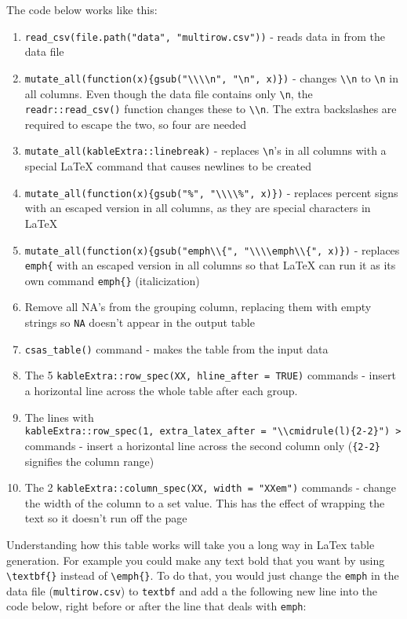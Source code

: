 \documentclass[12pt]{article}\usepackage[]{graphicx}\usepackage[]{color}
\begin{document}
The code below works like this:
\begin{enumerate}
\def\labelenumi{\arabic{enumi}.}

\item
  \texttt{read\_csv(file.path("data",\ "multirow.csv"))} - reads data in from the data file
\item
  \texttt{mutate\_all(function(x)\{gsub("\textbackslash{}\textbackslash{}\textbackslash{}\textbackslash{}n",\ "\textbackslash{}n",\ x)\})} - changes \texttt{\textbackslash{}\textbackslash{}n} to \texttt{\textbackslash{}n} in all columns. Even though the data file contains only \texttt{\textbackslash{}n}, the \texttt{readr::read\_csv()} function changes these to \texttt{\textbackslash{}\textbackslash{}n}. The extra backslashes are required to escape the two, so four are needed
\item
  \texttt{mutate\_all(kableExtra::linebreak)} - replaces \texttt{\textbackslash{}n}'s in all columns with a special LaTeX command that causes newlines to be created
\item
  \texttt{mutate\_all(function(x)\{gsub("\%",\ "\textbackslash{}\textbackslash{}\textbackslash{}\textbackslash{}\%",\ x)\})} - replaces percent signs with an escaped version in all columns, as they are special characters in LaTeX
\item
  \texttt{mutate\_all(function(x)\{gsub("emph\textbackslash{}\textbackslash{}\{",\ "\textbackslash{}\textbackslash{}\textbackslash{}\textbackslash{}emph\textbackslash{}\textbackslash{}\{",\ x)\})} - replaces \texttt{emph\{} with an escaped version in all columns so that LaTeX can run it as its own command \texttt{emph\{\}} (italicization)
\item
  Remove all NA's from the grouping column, replacing them with empty strings so \texttt{NA} doesn't appear in the output table
\item
  \texttt{csas\_table()} command - makes the table from the input data
\item
  The 5 \texttt{kableExtra::row\_spec(XX,\ hline\_after\ =\ TRUE)} commands - insert a horizontal line across the whole table after each group.
\item
  The lines with \texttt{kableExtra::row\_spec(1,\ extra\_latex\_after\ =\ "\textbackslash{}\textbackslash{}cmidrule(l)\{2-2\}")\ \textbar{}\textgreater{}} commands - insert a horizontal line across the second column only (\texttt{\{2-2\}} signifies the column range)
\item
  The 2 \texttt{kableExtra::column\_spec(XX,\ width\ =\ "XXem")} commands - change the width of the column to a set value. This has the effect of wrapping the text so it doesn't run off the page
\end{enumerate}
Understanding how this table works will take you a long way in LaTex table generation. For example you could make any text bold that you want by using \texttt{\textbackslash{}textbf\{\}} instead of \texttt{\textbackslash{}emph\{\}}. To do that, you would just change the \texttt{emph} in the data file (\texttt{multirow.csv}) to \texttt{textbf} and add a the following new line into the code below, right before or after the line that deals with \texttt{emph}:
\end{document}
